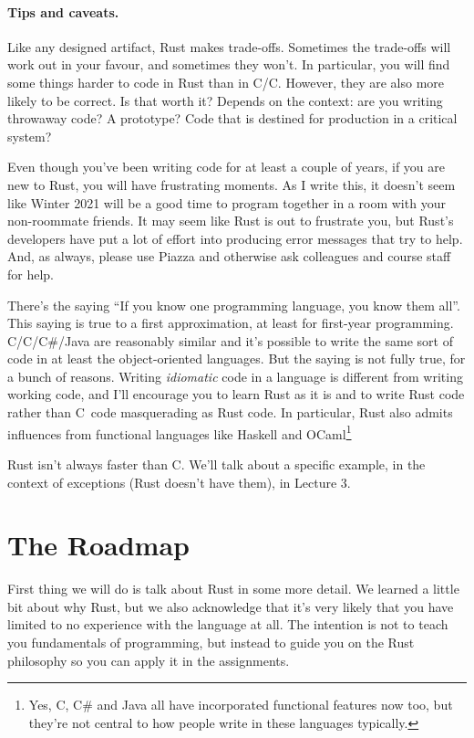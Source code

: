 \documentclass[a4paper]{report}
\newcommand{\CPP}{C\nolinebreak\hspace{-.05em}\raisebox{.4ex}{\tiny\bf +}\nolinebreak\hspace{-.10em}\raisebox{.4ex}{\tiny\bf +}}
\def\CPP{{C\nolinebreak[4]\hspace{-.05em}\raisebox{.4ex}{\tiny\bf ++}}}
\begin{document}
\paragraph{Tips and caveats.}
Like any designed artifact, Rust makes trade-offs. Sometimes the trade-offs will work out in your favour, and sometimes they won't. In particular, you will find some things harder to code in Rust than in C/\CPP. However, they are also more likely to be correct. Is that worth it? Depends on the context: are you writing throwaway code? A prototype? Code that is destined for production in a critical system?

Even though you've been writing code for at least a couple of years, if you are new to Rust, you will have frustrating moments. As I write this, it doesn't seem like Winter 2021 will be a good time to program together in a room with your non-roommate friends. It may seem like Rust is out to frustrate you, but Rust's developers have put a lot of effort into producing error messages that try to help. And, as always, please use Piazza and otherwise ask colleagues and course staff for help.

There's the saying ``If you know one programming language, you know them all''. This saying is true to a first approximation, at least for first-year programming. C/\CPP/C\#/Java are reasonably similar and it's possible to write the same sort of code in at least the object-oriented languages. But the saying is not fully true, for a bunch of reasons. Writing \emph{idiomatic} code in a language is different from writing working code, and I'll encourage you to learn Rust as it is and to write Rust code rather than \CPP~code masquerading as Rust code. In particular, Rust also admits influences from functional languages like Haskell and OCaml\footnote{Yes, \CPP, C\# and Java all have incorporated functional features now too, but they're not central to how people write in these languages typically.}

Rust isn't always faster than \CPP. We'll talk about a specific example, in the context of exceptions (Rust doesn't have them), in Lecture 3.

\section*{The Roadmap}
First thing we will do is talk about Rust in some more detail. We learned a little bit about why Rust, but we also acknowledge that it's very likely that you have limited to no experience with the language at all. The intention is not to teach you fundamentals of programming, but instead to guide you on the Rust philosophy so you can apply it in the assignments. 
\end{document}
